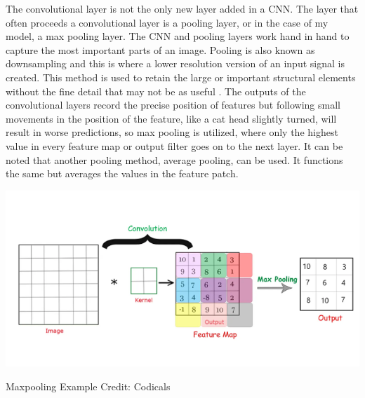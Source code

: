 \documentclass[12pt]{article}
\begin{document}
                The convolutional layer is not the only new layer added in a CNN. 
                The layer that often proceeds a convolutional layer is a pooling layer, or in the case of my model, a max pooling layer.
                The CNN and pooling layers work hand in hand to capture the most important parts of an image. 
                Pooling is also known as downsampling and this is where a lower resolution version of an input signal is created. 
                This method is used to retain the large or important structural elements 
                without the fine detail that may not be as useful \cite{brownlee2020}. 
                The outputs of the convolutional layers record the precise position of features 
                but following small movements in the position of the feature, like a cat head slightly turned, 
                will result in worse predictions, so max pooling is utilized, 
                where only the highest value in every feature map or output filter goes on to the next layer. 
                It can be noted that another pooling method, average pooling, can be used. 
                It functions the same but averages the values in the feature patch.
                
                \begin{table}[h]
            
                    \begin{center}
    
                        \includegraphics[scale=0.9]{maxpooling.png}
                        \caption{Maxpooling Example \cite{kumar2021} Credit: Codicals}
                        \label{maxpool-fig}
            
                    \end{center}
                    
                \end{table}
\end{document}
